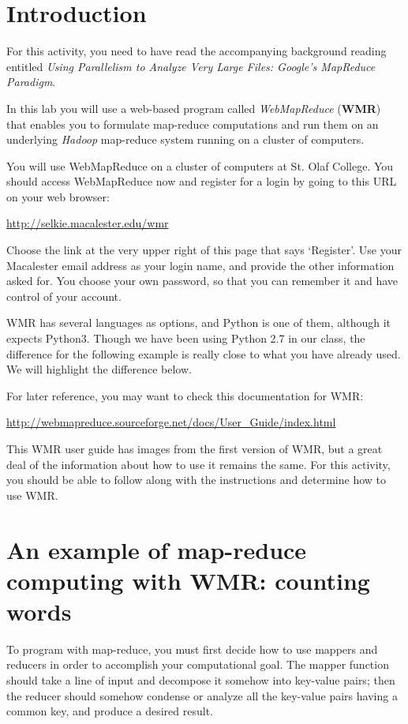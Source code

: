 \documentclass[letterpaper,10pt,openany,oneside]{sphinxmanual}
\begin{document}
\section{Introduction}
\label{wmr_py/wmr_py:introduction}
For this activity, you need to have read the accompanying
background reading entitled
\emph{Using Parallelism to Analyze Very Large Files: Google's MapReduce Paradigm}.

In this lab you will use a web-based program called \emph{WebMapReduce}
(\textbf{WMR}) that enables you to formulate map-reduce computations and
run them on an underlying \emph{Hadoop} map-reduce system running on a
cluster of computers.

You will use WebMapReduce on a cluster of computers at St. Olaf
College. You should access WebMapReduce now and register for a
login by going to this URL on your web browser:

\href{http://selkie.macalester.edu/wmr}{http://selkie.macalester.edu/wmr}

Choose the link at the very upper right of this page that says
`Register'. Use your Macalester email address as your login name,
and provide the other information asked for. You choose your own
password, so that you can remember it and have control of your
account.

WMR has several languages as options, and Python is one of them,
although it expects Python3. Though we have been using Python 2.7
in our class, the difference for the following example is really
close to what you have already used. We will highlight the
difference below.

For later reference, you may want to check this documentation for
WMR:

\href{http://webmapreduce.sourceforge.net/docs/User\_Guide/index.html}{http://webmapreduce.sourceforge.net/docs/User\_Guide/index.html}

This WMR user guide has images from the first version of WMR, but a
great deal of the information about how to use it remains the same.
For this activity, you should be able to follow along with the
instructions and determine how to use WMR.


\section{An example of map-reduce computing with WMR: counting words}
\label{wmr_py/wmr_py:an-example-of-map-reduce-computing-with-wmr-counting-words}
To program with map-reduce, you must first decide how to use
mappers and reducers in order to accomplish your computational
goal. The mapper function should take a line of input and decompose
it somehow into key-value pairs; then the reducer should somehow
condense or analyze all the key-value pairs having a common key,
and produce a desired result.
\end{document}
